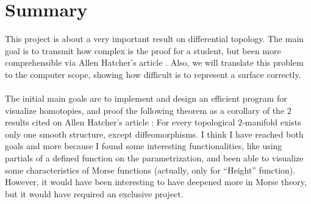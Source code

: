 %

\chapter{Summary}
This project is about a very important result on differential topology. The main goal is to transmit how complex is the proof for a student, but been more comprehensible via Allen Hatcher's article \cite{arXiv:1312.3518}. Also, we will translate this problem to the computer scope, showing how difficult is to represent a surface correctly.\\
\\The initial main goals are to implement and design an efficient program for visualize homotopies, and proof the following theorem as a corollary of the $2$ results cited on Allen Hatcher's article \cite{arXiv:1312.3518}: For every topological $2$-manifold exists only one smooth structure, except diffeomorphisms. I think I have reached both goals and more because I found some interesting functionalities, like using partials of a defined function on the parametrization, and been able to visualize some characteristics of Morse functions (actually, only for ``Height'' function). However, it would have been interesting to have deepened more in Morse theory, but it would have required an exclusive project.\\

